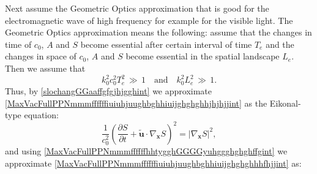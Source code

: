 \documentclass{article}
\theoremstyle{definition}
\theoremstyle{remark}
\renewcommand{\vec}[1]{\mathbf{#1}}
\newcommand{\er}{\eqref}
\newcommand{\er}{\eqref}
\begin{document}
Next assume the Geometric Optics approximation that is good for the
electromagnetic wave of high frequency for example for the visible
light. The Geometric Optics approximation means the following:
assume that the changes in time of $c_0$, $A$ and $S$ become
essential after certain interval of time $T_e$ and the changes in
space of $c_0$, $A$ and $S$ become essential in the spatial
landscape $L_e$. Then we assume that
\begin{equation}\label{slochangGGaaffgfgjhjgghint}
k^2_0c^2_0T^2_e\,\gg\, 1\quad\text{and}\quad k^2_0L^2_e\,\gg\, 1.
\end{equation}
Thus, by \er{slochangGGaaffgfgjhjgghint} we approximate
\er{MaxVacFullPPNmmmffffffiuiuhjuughbghhiuijghghghhjhjhjjint} as the
Eikonal-type equation:
\begin{equation}\label{MaxVacFullPPNmmmffffffiuiuhjuughbghhiuijghghghhjhjhhghyuyjjjhhjhjffint}
\frac{1}{c^2_0}\left(\frac{\partial S}{\partial t}+\vec {\tilde
u}\cdot\nabla_\vec x S\right)^2=\left|\nabla_\vec x S\right|^2,
\end{equation}
and using \er{MaxVacFullPPNmmmffffffhhtygghGGGGyuhggghghghffgint} we
approximate
\er{MaxVacFullPPNmmmffffffiuiuhjuughbghhiuijghghghhhfhjjint} as:
%
%
%
\begin{comment}
\begin{multline}\label{MaxVacFullPPNmmmffffffiuiuhjuughbghhiuijghghghhhfhhghghguygtjjint}
\frac{1}{c^2_0}\left(\frac{\partial^2 S}{\partial t^2}+2\vec {\tilde
u}\cdot \nabla_{\vec x}\left(\frac{\partial S}{\partial
t}\right)+\left(\nabla^2_{\vec x}S\cdot\vec {\tilde
u}\right)\cdot\vec {\tilde
u}\right)A\\+\frac{2}{c^2_0}\left(\frac{\partial S}{\partial t}+\vec
{\tilde u}\cdot\nabla_{\vec x}S\right)\left(\frac{\partial
A}{\partial t}+\vec {\tilde u}\cdot\nabla_{\vec
x}A\right)-\left(\Delta_{\vec x}S\right)A-2\nabla_{\vec
x}A\cdot\nabla_{\vec x}S=0\,.
\end{multline}
\end{comment}
%
%
%
%
%
%
\begin{comment}
\begin{multline}\label{MaxVacFullPPNmmmffffffiuiuhjuughbghhiuijghghghhhfhhghghguygtjjint}
\\
%
%
%
\frac{1}{c^2_0}\left(\frac{\partial^2 S}{\partial
t^2}\right)A+\frac{2}{c^2_0}\frac{\partial A}{\partial
t}\frac{\partial S}{\partial t}+\frac{2 }{c^2_0}\left(\vec {\tilde
u}\cdot \nabla_{\vec x}\left(\frac{\partial S}{\partial
t}\right)\right)A+\frac{2}{c^2_0}\left(\vec {\tilde
u}\cdot\nabla_{\vec x}A\right)\frac{\partial S}{\partial
t}+\frac{2}{c^2_0}\left(\vec {\tilde u}\cdot\nabla_{\vec
x}S\right)\frac{\partial A}{\partial
t}\\+\frac{1}{c^2_0}\left(\left(\nabla^2_{\vec x}S\cdot\vec {\tilde
u}\right)\cdot\vec {\tilde u}\right)A+\frac{2}{c^2_0}\left(\vec
{\tilde u}\cdot\nabla_{\vec x}A\right)\left(\vec {\tilde
u}\cdot\nabla_{\vec x}S\right)-\left(\Delta_{\vec
x}S\right)A-2\nabla_{\vec x}A\cdot\nabla_{\vec x}S=0\,.
\end{multline}
\end{comment}
\end{document}
